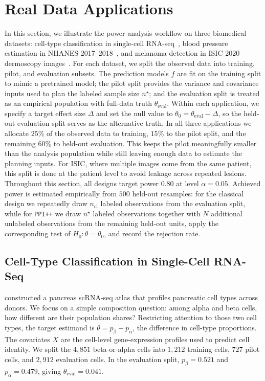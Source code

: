 \documentclass[12pt]{article}
\begin{document}
\section{Real Data Applications}
\label{sec:applications}
In this section, we illustrate the power-analysis workflow on three
biomedical datasets: cell-type classification in single-cell
RNA-seq~\citep{baron2016single}, blood pressure estimation in NHANES
2017--2018~\citep{nhanes2020}, and melanoma detection in ISIC 2020
dermoscopy images~\citep{rotemberg2021patient}. For each dataset, we
split the observed data into training, pilot, and evaluation subsets.
The prediction models $f$ are fit on the training split to mimic a
pretrained model; the pilot split provides the variance and covariance
inputs used to plan the labeled sample size $n^\star$; and the
evaluation split is treated as an empirical population with full-data
truth $\theta_{\mathrm{eval}}$. Within each application, we specify a
target effect size $\Delta$ and set the null value to
$\theta_0 = \theta_{\mathrm{eval}} - \Delta$, so the held-out
evaluation split serves as the alternative truth. In all three
applications we allocate $25\%$ of the observed data to training,
$15\%$ to the pilot split, and the remaining $60\%$ to held-out
evaluation. This keeps the pilot meaningfully smaller than the analysis
population while still leaving enough data to estimate the planning
inputs. For ISIC, where multiple images come from the same patient,
this split is done at the patient level to avoid leakage across
repeated lesions. Throughout this section, all designs target power
$0.80$ at level $\alpha = 0.05$. Achieved power is estimated
empirically from $500$ held-out resamples: for the classical design we
repeatedly draw $n_{\mathrm{cl}}$ labeled observations from the
evaluation split, while for \texttt{PPI++} we draw $n^\star$ labeled
observations together with $N$ additional unlabeled observations from
the remaining held-out units, apply the corresponding test of
$H_0: \theta = \theta_0$, and record the rejection rate.

\subsection{Cell-Type Classification in Single-Cell RNA-Seq}

\citet{baron2016single} constructed a pancreas scRNA-seq atlas that profiles pancreatic cell types across donors. We focus on a simple composition question: among alpha and beta cells, how different
are their population shares? Restricting attention to those two cell
types, the target estimand is
$\theta = p_{\beta} - p_{\alpha}$, the difference in cell-type
proportions. The covariates $X$ are the cell-level gene-expression
profiles used to predict cell identity. We split the $4{,}851$
beta-or-alpha cells into $1{,}212$ training cells, $727$ pilot cells,
and $2{,}912$ evaluation cells. In the evaluation split,
$p_{\beta} = 0.521$ and $p_{\alpha} = 0.479$, giving
$\theta_{\mathrm{eval}} = 0.041$.
\end{document}
